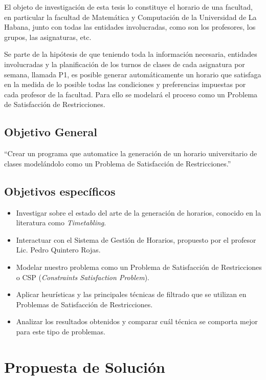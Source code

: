 \begin{introduction}
El objeto de investigación de esta tesis lo constituye el horario de una facultad, en particular la facultad de Matem\'atica y Computaci\'on de la Universidad de La Habana, junto con todas las entidades involucradas, como son los profesores, los grupos, las asignaturas, etc.

Se parte de la hipótesis de que teniendo toda la información necesaria, entidades involucradas y la
planificación de los turnos de clases de cada asignatura por semana, llamada P1, es posible generar
automáticamente un horario que satisfaga en la medida de lo posible todas las condiciones y preferencias
impuestas por cada profesor de la facultad. Para ello se modelar\'a el proceso como un Problema de Satisfacci\'on de Restricciones.


\subsection*{Objetivo General}

``Crear un programa que automatice la generación de un horario universitario de clases model\'andolo como un Problema de Satisfacci\'on de Restricciones.''

\subsection*{Objetivos específicos}

\begin{itemize}
	\item Investigar sobre el estado del arte de la generación de horarios, conocido en la literatura
		como \emph{Timetabling}.
	\item Interactuar con el Sistema de Gestión de Horarios, propuesto por el profesor Lic. Pedro
		Quintero Rojas.
	\item Modelar nuestro problema como un Problema de Satisfacción de Restricciones o CSP (\emph{Constraints 
		Satisfaction Problem}).
	\item Aplicar heurísticas y las principales técnicas de filtrado que se utilizan en Problemas de
		Satisfacción de Restricciones.
	\item Analizar los resultados obtenidos y comparar cu\'al técnica se comporta mejor para este tipo de
		problemas.
\end{itemize}

\section*{Propuesta de Solución}


\end{introduction}
